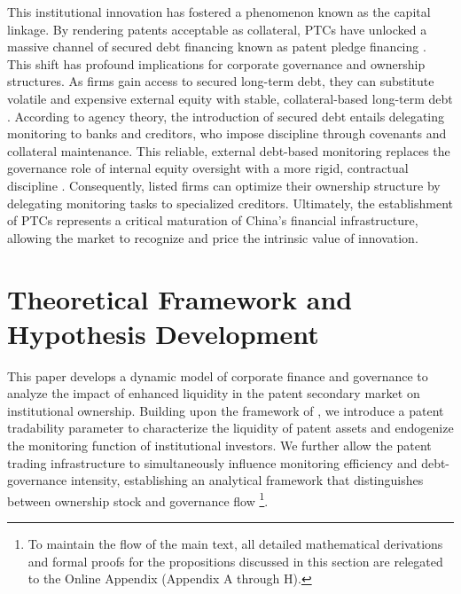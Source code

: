 \documentclass[12pt,a4paper]{article}
\begin{document}
This institutional innovation has fostered a phenomenon known as the capital linkage. By rendering patents acceptable as collateral, PTCs have unlocked a massive channel of secured debt financing known as patent pledge financing \citep{gill2024leveraging}. This shift has profound implications for corporate governance and ownership structures. As firms gain access to secured long-term debt, they can substitute volatile and expensive external equity with stable, collateral-based long-term debt \citep{myers1984corporate,shyam1999testing}. According to agency theory, the introduction of secured debt entails delegating monitoring to banks and creditors, who impose discipline through covenants and collateral maintenance. This reliable, external debt-based monitoring replaces the governance role of internal equity oversight with a more rigid, contractual discipline \citep{rajan1995covenants,bratton2006bond}. Consequently, listed firms can optimize their ownership structure by delegating monitoring tasks to specialized creditors. Ultimately, the establishment of PTCs represents a critical maturation of China’s financial infrastructure, allowing the market to recognize and price the intrinsic value of innovation.

\section{Theoretical Framework and Hypothesis Development}\label{sec3}
This paper develops a dynamic model of corporate finance and governance to analyze the impact of enhanced liquidity in the patent secondary market on institutional ownership. Building upon the framework of \cite{falato2022rising}, we introduce a patent tradability parameter to characterize the liquidity of patent assets and endogenize the monitoring function of institutional investors. We further allow the patent trading infrastructure to simultaneously influence monitoring efficiency and debt-governance intensity, establishing an analytical framework that distinguishes between ownership stock and governance flow \footnote{To maintain the flow of the main text, all detailed mathematical derivations and formal proofs for the propositions discussed in this section are relegated to the Online Appendix (Appendix A through H).}. 
\end{document}
